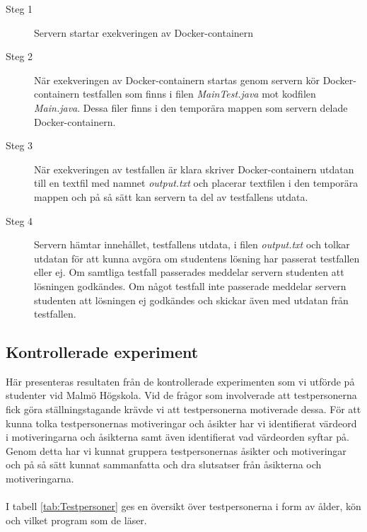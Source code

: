 \documentclass[a4paper,11pt]{article}
\begin{document}
{\begin{description}
    \item [Steg 1] Servern startar exekveringen av Docker-containern
    \item [Steg 2] När exekveringen av Docker-containern startas genom servern kör Docker-containern testfallen som finns i filen \textit{MainTest.java} mot kodfilen \textit{Main.java}. Dessa filer finns i den temporära mappen som servern delade Docker-containern.
    \item [Steg 3] När exekveringen av testfallen är klara skriver Docker-containern utdatan till en textfil med namnet \textit{output.txt} och placerar textfilen i den temporära mappen och på så sätt kan servern ta del av testfallens utdata.
    \item [Steg 4] Servern hämtar innehållet, testfallens utdata, i filen \textit{output.txt} och tolkar utdatan för att kunna avgöra om studentens lösning har passerat testfallen eller ej. Om samtliga testfall passerades meddelar servern studenten att lösningen godkändes. Om något testfall inte passerade meddelar servern studenten att lösningen ej godkändes och skickar även med utdatan från testfallen.
\end{description}

\newpage
\subsection{Kontrollerade experiment} \label{experiment}

Här presenteras resultaten från de kontrollerade experimenten som vi utförde på studenter vid Malmö Högskola. Vid de frågor som involverade att testpersonerna fick göra ställningstagande krävde vi att testpersonerna motiverade dessa. För att kunna tolka testpersonernas motiveringar och åsikter har vi identifierat värdeord i motiveringarna och åsikterna samt även identifierat vad värdeorden syftar på. Genom detta har vi kunnat gruppera testpersonernas åsikter och motiveringar och på så sätt kunnat sammanfatta och dra slutsatser från åsikterna och motiveringarna. 
\\
\\
I tabell \ref{tab:Testpersoner} ges en översikt över testpersonerna i form av ålder, kön och vilket program som de läser.

}
\end{document}
